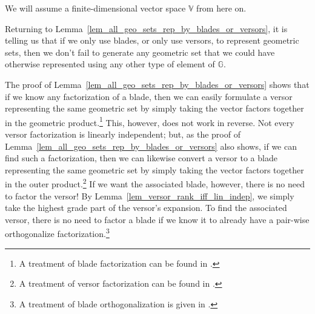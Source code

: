 \documentclass{birkjour}
\theoremstyle{definition}
\theoremstyle{remark}
\numberwithin{equation}{section}
\newcommand{\G}{\mathbb{G}}
\newcommand{\V}{\mathbb{V}}
\begin{document}
We will assume a finite-dimensional vector space $\V$ from here on.

Returning to Lemma~\ref{lem_all_geo_sets_rep_by_blades_or_versors}, it is telling us that if we only use blades, or only use versors, to represent geometric sets,
then we don't fail to generate any geometric set
that we could have otherwise represented using any other type of element of $\G$.

The proof of Lemma~\ref{lem_all_geo_sets_rep_by_blades_or_versors} shows that if we know
any factorization of a blade, then we can easily formulate a versor representing the same geometric set
by simply taking the vector factors together in the geometric product.\footnote{A treatment of blade factorization can be found in \cite[p. 533]{Dorst07}.}
This, however, does not work in reverse.  Not every versor factorization is linearly independent; but,
as the proof of Lemma~\ref{lem_all_geo_sets_rep_by_blades_or_versors} also shows, if we can find such a factorization, then we can likewise convert a versor
to a blade representing the same geometric set by simply taking the vector factors together in the outer product.\footnote{A treatment of versor factorization can be found in \cite[p. 107]{Perwass09}.}
If we want the associated blade, however, there is no need to factor the versor!
By Lemma~\ref{lem_versor_rank_iff_lin_indep}, we simply take the highest grade part of the versor's expansion.
To find the associated versor, there is no need to factor a blade if we know it to already have a pair-wise orthogonalize factorization.\footnote{A treatment of blade orthogonalization is given in \cite[p. 88]{Doran03}.}




\end{document}

